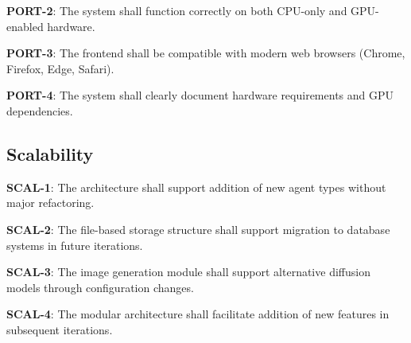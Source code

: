 \textbf{PORT-2}: The system shall function correctly on both CPU-only and GPU-enabled hardware.

\textbf{PORT-3}: The frontend shall be compatible with modern web browsers (Chrome, Firefox, Edge, Safari).

\textbf{PORT-4}: The system shall clearly document hardware requirements and GPU dependencies.

\subsection{Scalability}

\textbf{SCAL-1}: The architecture shall support addition of new agent types without major refactoring.

\textbf{SCAL-2}: The file-based storage structure shall support migration to database systems in future iterations.

\textbf{SCAL-3}: The image generation module shall support alternative diffusion models through configuration changes.

\textbf{SCAL-4}: The modular architecture shall facilitate addition of new features in subsequent iterations.

